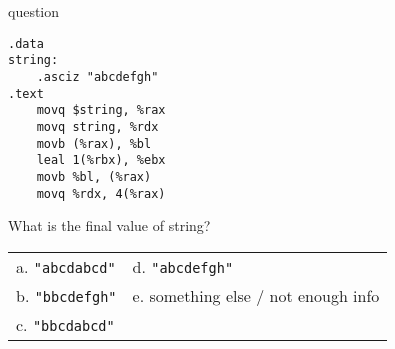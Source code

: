 \begin{frame}[fragile,label=question]{question}
\lstset{style=small,language=myasm,deletekeywords=bl}
\begin{lstlisting}
.data
string:
    .asciz "abcdefgh"
.text
    movq $string, %rax
    movq string, %rdx
    movb (%rax), %bl
    leal 1(%rbx), %ebx
    movb %bl, (%rax)
    movq %rdx, 4(%rax)
\end{lstlisting}
{\small What is the final value of string?}
\begin{tabular}{ll}
a. \texttt{"abcdabcd"} & d. \texttt{"abcdefgh"} \\
b. \texttt{"bbcdefgh"} & e. something else / not enough info \\
c. \texttt{"bbcdabcd"} & ~ \\
\end{tabular}
\end{frame}
